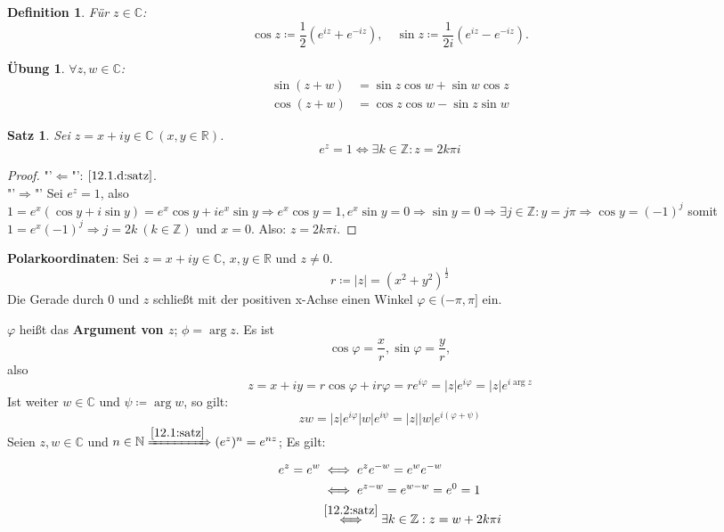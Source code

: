\documentclass[titlepage,ngerman,a4paper,headsepline]{scrartcl}
\newcommand{\C}{\mathbb{C}}
\newcommand{\N}{\mathbb{N}}
\newcommand{\R}{\mathbb{R}}
\newcommand{\Z}{\mathbb{Z}}
\theoremstyle{named}
\theoremstyle{dotless}
\newtheorem{satz}[namedtheorem]{Satz}
\newtheorem*{definition}{Definition}
\newtheorem*{uebung}{Übung}
\begin{document}
\begin{definition}
	Für $z \in \C$:
	$$ \cos z \coloneqq \frac{1}{2} \left( e^{iz} + e^{-iz} \right), \quad \sin z \coloneqq \frac{1}{2 i} \left( e^{iz} - e^{-iz} \right). $$
\end{definition}


\begin{uebung}
	$\forall z, w \in \C$:
	\begin{align*}
		\sin (z + w) & = \sin z \cos w + \sin w \cos z \\
		\cos (z + w) & = \cos z \cos w - \sin z \sin w
	\end{align*}	
\end{uebung}


\begin{satz} \label{12.2:satz}
	Sei $z = x + i y \in \C ~(x, y \in \R)$.
	$$ e^{z} = 1 \iff \exists k \in \Z: z = 2 k \pi i $$
\end{satz}

\begin{proof}
	"'$\Leftarrow$"': $\ref{12.1.d:satz}$. \\
	"'$\Rightarrow$"' Sei $e^{z} = 1$, also $1 = e^{x} ( \cos y + i \sin y) = e^{x} \cos y + i e^{x} \sin y \Rightarrow e^{x} \cos y = 1, e^{x} \sin y = 0 \Rightarrow \sin y = 0 \Rightarrow \exists j \in \Z: y = j \pi \Rightarrow \cos y = (-1)^{j}$ somit $1 = e^{x} (-1)^{j} \Rightarrow j = 2k ~(k \in \Z)$ und $x = 0$. Also: $z = 2k \pi i$.
\end{proof}

 
\textbf{Polarkoordinaten}: Sei $z = x + iy \in \C$, $x, y \in \R$ und $z \neq 0$.
	$$ r \coloneqq |z| = (x^{2} + y^{2})^{\frac{1}{2}} $$
	Die Gerade durch $0$ und $z$ schließt mit der positiven x-Achse einen Winkel $\varphi \in (-\pi, \pi]$ ein.
	
	$\varphi$ hei{\ss}t das \textbf{Argument von $z$}; $\phi = \arg z$. Es ist
		$$ \cos \varphi = \frac{x}{r}, \sin \varphi = \frac{y}{r}, $$
	also
		$$  z = x + iy = r \cos \varphi + i r \varphi = r e^{i \varphi} = |z| e^{i \varphi} = |z| e^{i \arg z} $$
	Ist weiter $w \in \C$ und $\psi \coloneqq \arg w$, so gilt:
		$$ z w = |z| e^{i \varphi} |w| e^{i \psi} = |z| |w| e^{i(\varphi + \psi)} $$
	Seien $z, w \in \C$ und $n \in \N \xRightarrow[]{\ref{12.1:satz}} (e^{z})^{n} = e^{nz}$; Es gilt:
	\begin{align*}
		e^{z} = e^{w} & \iff e^{z} e^{-w} = e^{w} e^{-w} \\
			& \iff e^{z-w} = e^{w - w} = e^{0} =1 \\
			& \overset{\ref{12.2:satz}}{\iff} \exists k \in \Z: z = w + 2 k \pi i
	\end{align*}
\end{document}
